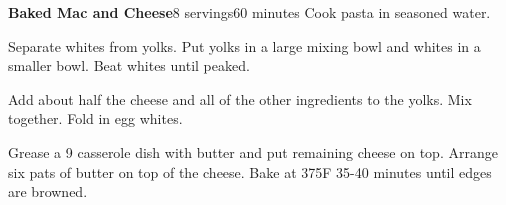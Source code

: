 \documentclass[../Cookbook.tex]{subfiles}
\begin{document}
\begin{recipe}[BakedMacAndCheese]{\textbf{Baked Mac and Cheese}}{8 servings}{60 minutes}
	Cook pasta in seasoned water.

	Separate whites from yolks. Put yolks in a large mixing bowl and whites in a smaller bowl.
	Beat whites until peaked.

	Add about half the cheese and all of the other ingredients to the yolks. Mix together.
	Fold in egg whites.

	Grease a 9 casserole dish with butter and put remaining cheese on top. Arrange six pats of butter on top of the cheese.
	Bake at 375\0F 35-40 minutes until edges are browned.
\end{recipe}
\end{document}

